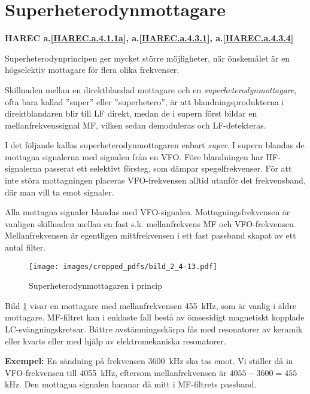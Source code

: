 \section{Superheterodynmottagare}
\textbf{
HAREC a.\ref{HAREC.a.4.1.1a}\label{myHAREC.a.4.1.1a},
 a.\ref{HAREC.a.4.3.1}\label{myHAREC.a.4.3.1},
 a.\ref{HAREC.a.4.3.4}\label{myHAREC.a.4.3.4}
}

Superheterodynprincipen ger mycket större möjligheter, när önskemålet
är en högselektiv mottagare för flera olika frekvenser.

Skillnaden mellan en direktblandad mottagare och en
\emph{superheterodynmottagare}, ofta bara kallad ''super'' eller
''superhetero'', är att blandningsprodukterna i direktblandaren blir till
LF direkt, medan de i supern först bildar en mellanfrekvenssignal MF,
vilken sedan demoduleras och LF-detekteras.

I det följande kallas superheterodynmottagaren enbart \emph{super}.
I supern blandas de mottagna signalerna med signalen från en VFO.
Före blandningen har HF-signalerna passerat ett selektivt försteg, som
dämpar spegelfrekvenser.
För att inte störa mottagningen placeras VFO-frekvensen alltid utanför
det frekvensband, där man vill ta emot signaler.

Alla mottagna signaler blandas med VFO-signalen.
Mottagningsfrekvensen är vanligen skillnaden mellan en fast s.k.
mellanfrekvens MF och VFO-frekvensen.
Mellanfrekvensen är egentligen mittfrekvensen i ett fast passband skapat av
ett antal filter.

\begin{figure}
  \texttt{[image: images/cropped\_pdfs/bild\_2\_4-13.pdf]}
  \caption{Superheterodynmottagaren i princip}
  \label{fig:bildII4-13}
\end{figure}

Bild \ref{fig:bildII4-13} visar en mottagare med mellanfrekvensen 455~kHz,
som är vanlig i äldre mottagare.
MF-filtret kan i enklaste fall bestå av ömsesidigt magnetiskt kopplade
LC-svängningskretsar.
Bättre avstämningsskärpa fås med resonatorer av keramik eller kvarts eller med
hjälp av elektromekaniska resonatorer.

\textbf{Exempel:}
En sändning på frekvensen 3600~kHz ska tas emot.
Vi ställer då in VFO-frekvensen till 4055~kHz, eftersom mellanfrekvensen är
\(4055 - 3600 = 455\) kHz.
Den mottagna signalen hamnar då mitt i MF-filtrets passband.

